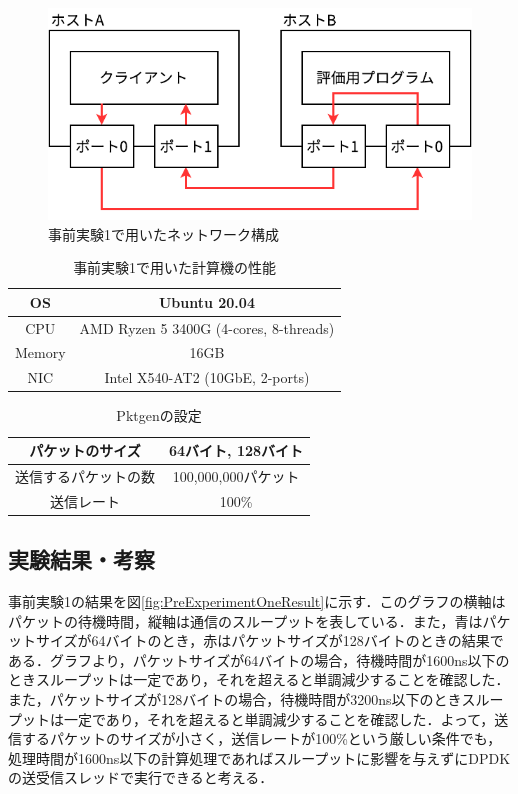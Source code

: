 \begin{figure}[htb]
  \centering
  \includegraphics[width=\columnwidth]{pictures/PreExperimentNetwork.pdf}
  \caption{事前実験1で用いたネットワーク構成}
  \label{fig:PreExperimentNetwork}
\end{figure}

\begin{table}[htb]
  \centering
  \caption{事前実験1で用いた計算機の性能}
  \begin{tabular}{|c|c|} \hline
    OS     & Ubuntu 20.04                           \\ \hline
    CPU    & AMD Ryzen 5 3400G (4-cores, 8-threads) \\ \hline
    Memory & 16GB                                   \\ \hline
    NIC    & Intel X540-AT2 (10GbE, 2-ports)        \\ \hline
  \end{tabular}
  \label{tab:MachineSpec}
\end{table}

\begin{table}[htb]
  \centering
  \caption{Pktgenの設定}
  \begin{tabular}{|c|c|} \hline
    パケットのサイズ     & 64バイト, 128バイト \\ \hline
    送信するパケットの数 & 100,000,000パケット \\ \hline
    送信レート           & 100\%               \\ \hline
  \end{tabular}
  \label{tab:PktgenSettings}
\end{table}

\subsection{実験結果・考察}
事前実験1の結果を図\ref{fig:PreExperimentOneResult}に示す．このグラフの横軸はパケットの待機時間，縦軸は通信のスループットを表している．また，青はパケットサイズが64バイトのとき，赤はパケットサイズが128バイトのときの結果である．グラフより，パケットサイズが64バイトの場合，待機時間が1600ns以下のときスループットは一定であり，それを超えると単調減少することを確認した．また，パケットサイズが128バイトの場合，待機時間が3200ns以下のときスループットは一定であり，それを超えると単調減少することを確認した．よって，送信するパケットのサイズが小さく，送信レートが100\%という厳しい条件でも，処理時間が1600ns以下の計算処理であればスループットに影響を与えずにDPDKの送受信スレッドで実行できると考える．

